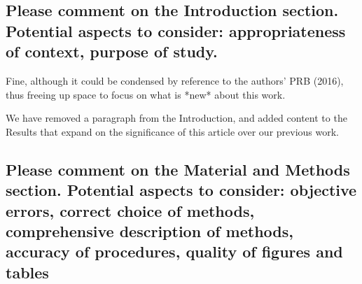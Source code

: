 \documentclass{article}
\begin{document}
\subsection{Please comment on the Introduction section. Potential aspects to
consider: appropriateness of context, purpose of study.}

Fine, although it could be condensed by reference to the authors' PRB (2016),
thus freeing up space to focus on what is *new* about this work.

\begin{shaded}
We have removed a paragraph from the Introduction, and added content to the Results that expand on the significance of this article over our previous work.
\end{shaded}


\subsection{Please comment on the Material and Methods section. Potential
aspects to consider: objective errors, correct choice of methods, comprehensive
description of methods, accuracy of procedures, quality of figures and tables}
\end{document}
